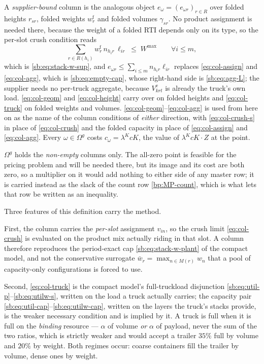A \emph{supplier-bound} column is the analogous object
$e_{\omega}=(e_{\omega r})_{r\in R}$ over folded heights $r_{sr}$,
folded weights $w^{\mathrm{f}}_{r}$ and folded volumes $\gamma_{sr}$. No
product assignment is needed there, because the weight of a folded RTI
depends only on its type, so the per-slot crush condition reads
\begin{equation}
\textstyle\sum_{r\in R(h_{i})} w^{\mathrm{f}}_{r}\,n_{h_{i}r}\,\ell_{ir}
  \;\le\;W^{\max}\qquad\forall i\le m,
\label{eq:col-crush-s}
\end{equation}
which is \eqref{sb:eq:stack-w-sup}, and $e_{\omega r}\le\sum_{i\le m}
n_{h_{i}r}\ell_{ir}$ replaces \eqref{eq:col-assign} and
\eqref{eq:col-agg}, which is \eqref{sb:eq:empty-cap}, whose right-hand
side is \eqref{sb:eq:agg-L}; the supplier needs no per-truck aggregate,
because $V^{\mathrm{e}}_{krt}$ is already the truck's own load. \eqref{eq:col-geom} and \eqref{eq:col-height}
carry over on folded heights and \eqref{eq:col-truck} on folded weights
and volumes. \eqref{eq:col-geom}--\eqref{eq:col-agg} is used from here
on as the name of the column conditions of \emph{either} direction,
with \eqref{eq:col-crush-s} in place of \eqref{eq:col-crush} and the
folded capacity in place of \eqref{eq:col-assign} and
\eqref{eq:col-agg}.
Every $\omega\in\Omega^{g}$ costs $c_{\omega}=\lambda^{K}cK$, the value
of $\lambda^{K}cK\cdot Z$ at the point.

$\Omega^{g}$ holds the \emph{non-empty} columns only. The all-zero
point is feasible for the pricing problem and will be needed there, but
its image and its cost are both zero, so a multiplier on it would add
nothing to either side of any master row; it is carried instead as the
slack of the count row \eqref{bp:MP-count}, which is what lets that row
be written as an inequality.

Three features of this definition carry the method.

First, the column carries the \emph{per-slot} assignment $v_{in}$, so
the crush limit \eqref{eq:col-crush} is evaluated on the product mix
actually riding in that slot. A column therefore reproduces the
period-exact cap \eqref{sb:eq:stack-w-plant} of the compact model, and
not the conservative surrogate $\bar w_{r}=\max_{n\in M(r)}w_{n}$ that
a pool of capacity-only configurations is forced to use.

Second, \eqref{eq:col-truck} is the compact model's full-truckload
disjunction \eqref{sb:eq:util-p}--\eqref{sb:eq:utilw-s},
written on the load a truck actually carries; the capacity pair
\eqref{sb:eq:util-cap}--\eqref{sb:eq:utilw-cap}, written on the layers
the truck's stacks provide, is the weaker necessary condition and is
implied by it. A truck is full when it is full on the \emph{binding}
resource --- $\alpha$ of volume \emph{or} $\alpha$ of payload, never the
sum of the two ratios, which is strictly weaker and would accept a
trailer $35\%$ full by volume and $20\%$ by weight. Both regimes occur:
coarse containers fill the trailer by volume, dense ones by weight.

